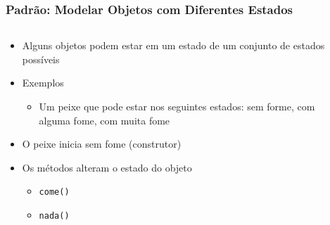 \documentclass[xcolor={dvipsnames,table},aspectratio=169]{beamer}
\begin{document}
\begin{frame}[fragile]\frametitle{Padrão: Modelar Objetos com Diferentes Estados}
\begin{columns}[T]
	\begin{column}{0.5\linewidth}
\begin{itemize}
	\item Alguns objetos podem estar em um estado de um conjunto de estados possíveis
	\item Exemplos
	\begin{itemize}
		\item Um peixe que pode estar nos seguintes estados: sem forme, com alguma fome, com muita fome
	\end{itemize}
	\item O peixe inicia sem fome (construtor)
	\item Os métodos alteram o estado do objeto
	\begin{itemize}
		\item \texttt{come()}
		\item \texttt{nada()}
	\end{itemize}
\end{itemize}
	\end{column}
	\begin{column}{0.5\linewidth}
{\tiny\inputminted[bgcolor=cyan!10]{java}{src/Peixe.java}}
	\end{column}
\end{columns}
\end{frame}
\end{document}
